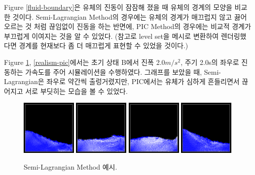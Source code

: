\documentclass[12pt, A4]{article}
\begin{document}
Figure \ref{fluid-boundary}은 유체의 진동이 잠잠해 졌을 때 유체의 경계의 모양을 비교한 것이다. Semi-Lagrangian Method의 경우에는 유체의 경계가 매끄럽지 않고 끓어오르는 것 처럼 끊임없이 진동을 하는 반면에, PIC Method의 경우에는 비교적 경계가 부끄럽게 이여지는 것을 알 수 있었다. (참고로 level set을 메시로 변환하여 렌더링했다면 경계를 현재보다 좀 더 매끄럽게 표현할 수 있었을 것이다.)


Figure \ref{realism-semilag}, \ref{realism-pic}에서는 초기 상태 B에서 진폭 2.0$m/s^2$, 주기 2.0s의 좌우로 진동하는 가속도를 주어 시뮬레이션을 수행하였다. 그래프를 보았을 때, Semi-Lagrangian은 좌우로 약간씩 출렁거렸지만, PIC에서는 유체가 심하게 흔들리면서 끊어지고 서로 부딧히는 모습을 볼 수 있었다.

\begin{figure}[h]
\includegraphics[width=0.24\textwidth]{realism-semilag-1}
\includegraphics[width=0.24\textwidth]{realism-semilag-2}
\includegraphics[width=0.24\textwidth]{realism-semilag-3}
\includegraphics[width=0.24\textwidth]{realism-semilag-4}
  \caption{Semi-Lagrangian Method 예시.}
  \label{realism-semilag}
\end{figure}
\end{document}
